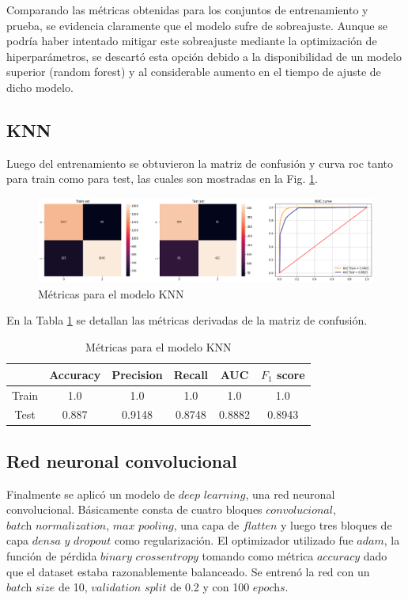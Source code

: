 Comparando las métricas obtenidas para los conjuntos de entrenamiento y prueba, se evidencia claramente que el modelo sufre de sobreajuste. Aunque se podría haber intentado mitigar este sobreajuste mediante la optimización de hiperparámetros, se descartó esta opción debido a la disponibilidad de un modelo superior (random forest) y al considerable aumento en el tiempo de ajuste de dicho modelo.

\subsection{KNN}

Luego del entrenamiento se obtuvieron la matriz de confusión y curva roc tanto para train como para test, las cuales son mostradas en la Fig. \ref{fig.knn}. 

\begin{figure}[H]
\centering
        \includegraphics[width=\linewidth]{chapters/deteccion/images/knn.png}
        \caption{Métricas para el modelo KNN}
        \label{fig.knn}
  \end{figure}
  
  En la Tabla \ref{tabla.knn} se detallan las métricas derivadas de la matriz de confusión. 

\begin{table}[H]
\centering
\begin{tabular}{|c|c|c|c|c|c|}
\hline
      & Accuracy & Precision & Recall & AUC    & $F_1$ score \\ \hline
Train & 1.0   & 1.0    & 1.0 & 1.0 & 1.0      \\ \hline
Test  & 0.887      & 0.9148    & 0.8748 & 0.8882  & 0.8943      \\ \hline
\end{tabular}
\caption{Métricas para el modelo KNN}
\label{tabla.knn}
\end{table}


\subsection{Red neuronal convolucional}

Finalmente se aplicó un modelo de $\textit{deep learning}$, una red neuronal convolucional. Básicamente consta de cuatro bloques $\textit{convolucional}$, $\textit{batch normalization}$, $\textit{max pooling}$, una capa de $\textit{flatten}$ y luego tres bloques de capa $\textit{densa y dropout}$ como regularización. El optimizador utilizado fue $\textit{adam}$, la función de pérdida $\textit{binary crossentropy}$ tomando como métrica $\textit{accuracy}$ dado que el dataset estaba razonablemente balanceado. Se entrenó la red con un $\textit{batch size}$ de 10, $\textit{validation split}$ de 0.2 y con 100 $\textit{epochs}$.

